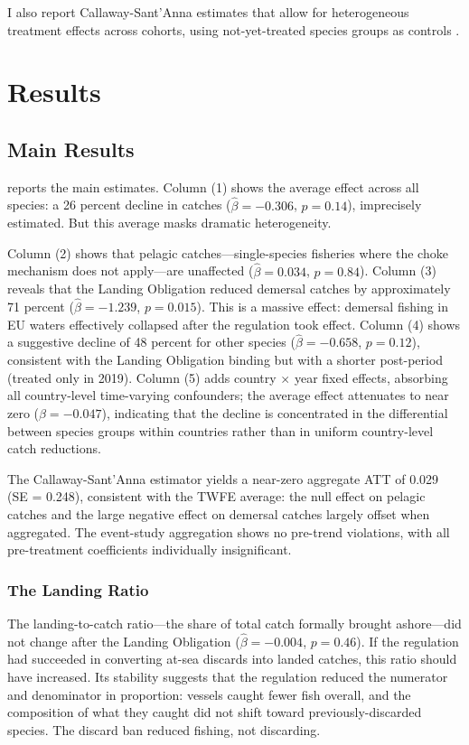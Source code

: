 \documentclass[12pt]{article}
\begin{document}
I also report Callaway-Sant'Anna estimates that allow for heterogeneous treatment effects across cohorts, using not-yet-treated species groups as controls \citep{callaway2021did}.


\section{Results}

\subsection{Main Results}

 reports the main estimates. Column (1) shows the average effect across all species: a 26 percent decline in catches ($\hat{\beta} = -0.306$, $p = 0.14$), imprecisely estimated. But this average masks dramatic heterogeneity.

Column (2) shows that pelagic catches---single-species fisheries where the choke mechanism does not apply---are unaffected ($\hat{\beta} = 0.034$, $p = 0.84$). Column (3) reveals that the Landing Obligation reduced demersal catches by approximately 71 percent ($\hat{\beta} = -1.239$, $p = 0.015$). This is a massive effect: demersal fishing in EU waters effectively collapsed after the regulation took effect. Column (4) shows a suggestive decline of 48 percent for other species ($\hat{\beta} = -0.658$, $p = 0.12$), consistent with the Landing Obligation binding but with a shorter post-period (treated only in 2019). Column (5) adds country $\times$ year fixed effects, absorbing all country-level time-varying confounders; the average effect attenuates to near zero ($\hat{\beta} = -0.047$), indicating that the decline is concentrated in the differential between species groups within countries rather than in uniform country-level catch reductions.



The Callaway-Sant'Anna estimator yields a near-zero aggregate ATT of 0.029 (SE = 0.248), consistent with the TWFE average: the null effect on pelagic catches and the large negative effect on demersal catches largely offset when aggregated. The event-study aggregation shows no pre-trend violations, with all pre-treatment coefficients individually insignificant.

\subsubsection*{The Landing Ratio} The landing-to-catch ratio---the share of total catch formally brought ashore---did not change after the Landing Obligation ($\hat{\beta} = -0.004$, $p = 0.46$). If the regulation had succeeded in converting at-sea discards into landed catches, this ratio should have increased. Its stability suggests that the regulation reduced the numerator and denominator in proportion: vessels caught fewer fish overall, and the composition of what they caught did not shift toward previously-discarded species. The discard ban reduced fishing, not discarding.
\end{document}

